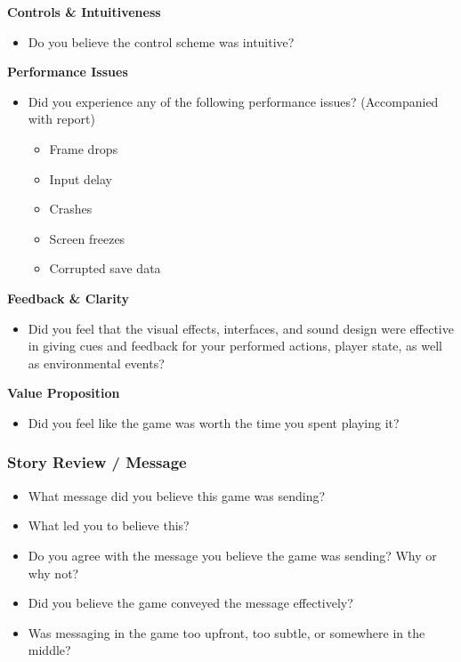 \documentclass[12pt, titlepage]{article}
\begin{document}
\textbf{Controls \& Intuitiveness}

\begin{itemize}
  \item Do you believe the control scheme was intuitive?
\end{itemize}

\textbf{Performance Issues}

\begin{itemize}
  \item Did you experience any of the following performance issues? (Accompanied with report)
  \begin{itemize}
    \item Frame drops
    \item Input delay
    \item Crashes
    \item Screen freezes
    \item Corrupted save data
  \end{itemize}
\end{itemize}

\textbf{Feedback \& Clarity}

\begin{itemize}
  \item Did you feel that the visual effects, interfaces, and sound design were effective in giving cues and feedback for your performed actions, player state, as well as environmental events?
\end{itemize}

\textbf{Value Proposition}

\begin{itemize}
  \item Did you feel like the game was worth the time you spent playing it?
\end{itemize}

\subsubsection{Story Review / Message}

\begin{itemize}
  \item What message did you believe this game was sending?
  \item What led you to believe this?
  \item Do you agree with the message you believe the game was sending? Why or why not?
  \item Did you believe the game conveyed the message effectively?
  \item Was messaging in the game too upfront, too subtle, or somewhere in the middle?
\end{itemize}
\end{document}
